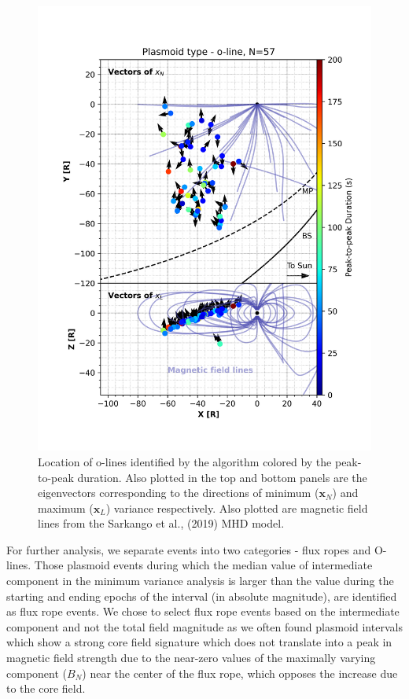 \begin{figure}
    \centering
    \includegraphics[height=0.8\textheight]{images6/TrajectoryLocationofEvent_quiver_o-line.png}
    \caption{Location of o-lines identified by the algorithm colored by the peak-to-peak duration. Also plotted in the top and bottom panels are the eigenvectors corresponding to the directions of minimum ($\mathbf{x}_N$) and maximum ($\mathbf{x}_L$) variance respectively. Also plotted are magnetic field lines from the Sarkango et al., (2019) MHD model.}
    \label{fig:trajectory-quiver-olines}
\end{figure}

For further analysis, we separate events into two categories - flux ropes and O-lines. Those plasmoid events during which the median value of intermediate component in the minimum variance analysis is larger than the value during the starting and ending epochs of the interval (in absolute magnitude), are identified as flux rope events. We chose to select flux rope events based on the intermediate component and not the total field magnitude as we often found plasmoid intervals which show a strong core field signature which does not translate into a peak in magnetic field strength due to the near-zero values of the maximally varying component ($B_N$) near the center of the flux rope, which opposes the increase due to the core field. 

